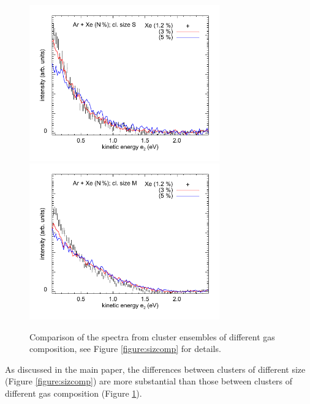 \documentclass[journal=jpccck,manuscript=suppinfo]{achemso}
\begin{document}
%
%
\begin{figure}
 \centering
 \includegraphics[width=8.2cm]{pics/677_661_cs.pdf}
 \includegraphics[width=8.2cm]{pics/668_653_cs.pdf}
 \caption{
Comparison of the spectra from cluster ensembles of different gas composition, see Figure \protect\ref{figure:sizcomp} for details.
 \label{figure:compcomp}
 }
\end{figure}
%
%
As discussed in the main paper, the differences between clusters of different size (Figure \ref{figure:sizcomp}) are more substantial than those between clusters of different gas composition (Figure \ref{figure:compcomp}).



\clearpage



\raggedright

\end{document}
